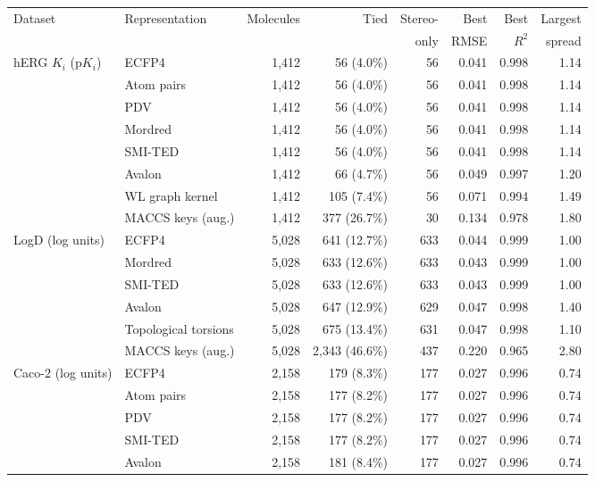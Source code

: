 \begin{table}[htbp]
\centering
\small
\setlength{\tabcolsep}{4pt}
\begin{adjustbox}{max width=\textwidth}
\begin{tabular}{llrrrrrr}
\toprule
Dataset & Representation & Molecules & Tied & Stereo- & Best & Best & Largest \\
 & & & & only & RMSE & $R^2$ & spread \\
\midrule
hERG $K_i$ (p$K_i$) & ECFP4 & 1,412 & 56 (4.0\%) & 56 & 0.041 & 0.998 & 1.14 \\
 & Atom pairs & 1,412 & 56 (4.0\%) & 56 & 0.041 & 0.998 & 1.14 \\
 & PDV & 1,412 & 56 (4.0\%) & 56 & 0.041 & 0.998 & 1.14 \\
 & Mordred & 1,412 & 56 (4.0\%) & 56 & 0.041 & 0.998 & 1.14 \\
 & SMI-TED & 1,412 & 56 (4.0\%) & 56 & 0.041 & 0.998 & 1.14 \\
 & Avalon & 1,412 & 66 (4.7\%) & 56 & 0.049 & 0.997 & 1.20 \\
 & WL graph kernel & 1,412 & 105 (7.4\%) & 56 & 0.071 & 0.994 & 1.49 \\
 & MACCS keys (aug.) & 1,412 & 377 (26.7\%) & 30 & 0.134 & 0.978 & 1.80 \\
\midrule
LogD (log units) & ECFP4 & 5,028 & 641 (12.7\%) & 633 & 0.044 & 0.999 & 1.00 \\
 & Mordred & 5,028 & 633 (12.6\%) & 633 & 0.043 & 0.999 & 1.00 \\
 & SMI-TED & 5,028 & 633 (12.6\%) & 633 & 0.043 & 0.999 & 1.00 \\
 & Avalon & 5,028 & 647 (12.9\%) & 629 & 0.047 & 0.998 & 1.40 \\
 & Topological torsions & 5,028 & 675 (13.4\%) & 631 & 0.047 & 0.998 & 1.10 \\
 & MACCS keys (aug.) & 5,028 & 2,343 (46.6\%) & 437 & 0.220 & 0.965 & 2.80 \\
\midrule
Caco-2 (log units) & ECFP4 & 2,158 & 179 (8.3\%) & 177 & 0.027 & 0.996 & 0.74 \\
 & Atom pairs & 2,158 & 177 (8.2\%) & 177 & 0.027 & 0.996 & 0.74 \\
 & PDV & 2,158 & 177 (8.2\%) & 177 & 0.027 & 0.996 & 0.74 \\
 & SMI-TED & 2,158 & 177 (8.2\%) & 177 & 0.027 & 0.996 & 0.74 \\
 & Avalon & 2,158 & 181 (8.4\%) & 177 & 0.027 & 0.996 & 0.74 \\

\end{tabular}
\end{adjustbox}
\end{table}
